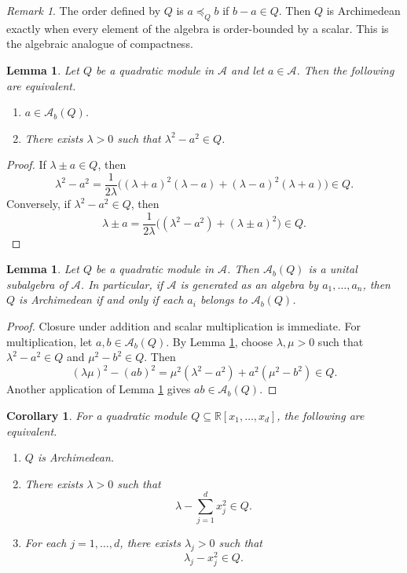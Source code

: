 \documentclass[11pt]{amsart}
\numberwithin{equation}{section}
\newtheorem{lemma}[theorem]{Lemma}
\newtheorem{corollary}[theorem]{Corollary}
\theoremstyle{definition}
\theoremstyle{remark}
\newtheorem{remark}[theorem]{Remark}
\newcommand{\R}{\mathbb{R}}
\newcommand{\Acal}{\mathcal{A}}
\newcommand{\Rxd}{\R[x_1,\dots,x_d]}
\newcommand{\1}{\mathbf{1}}
\begin{document}
\begin{remark}
The order defined by \(Q\) is \(a\preceq_Q b\) if \(b-a\in Q\). Then \(Q\) is Archimedean exactly when every element of the algebra is order-bounded by a scalar. This is the algebraic analogue of compactness.
\end{remark}

\begin{lemma}\label{lem:boundedcriterion}
Let \(Q\) be a quadratic module in \(\Acal\) and let \(a\in\Acal\). Then the following are equivalent.
\begin{enumerate}[label=\textup{(\roman*)}, leftmargin=2em]
\item \(a\in \Acal_b(Q)\).
\item There exists \(\lambda>0\) such that \(\lambda^2-a^2\in Q\).
\end{enumerate}
\end{lemma}

\begin{proof}
If \(\lambda\pm a\in Q\), then
\[
\lambda^2-a^2=\frac{1}{2\lambda}\bigl((\lambda+a)^2(\lambda-a)+(\lambda-a)^2(\lambda+a)\bigr)\in Q.
\]
Conversely, if \(\lambda^2-a^2\in Q\), then
\[
\lambda\pm a=\frac{1}{2\lambda}\bigl((\lambda^2-a^2)+(\lambda\pm a)^2\bigr)\in Q.
\]
\end{proof}

\begin{lemma}\label{lem:subalg}
Let \(Q\) be a quadratic module in \(\Acal\). Then \(\Acal_b(Q)\) is a unital subalgebra of \(\Acal\). In particular, if \(\Acal\) is generated as an algebra by \(a_1,\dots,a_n\), then \(Q\) is Archimedean if and only if each \(a_i\) belongs to \(\Acal_b(Q)\).
\end{lemma}

\begin{proof}
Closure under addition and scalar multiplication is immediate. For multiplication, let \(a,b\in\Acal_b(Q)\). By Lemma \ref{lem:boundedcriterion}, choose \(\lambda,\mu>0\) such that \(\lambda^2-a^2\in Q\) and \(\mu^2-b^2\in Q\). Then
\[
(\lambda\mu)^2-(ab)^2=\mu^2(\lambda^2-a^2)+a^2(\mu^2-b^2)\in Q.
\]
Another application of Lemma \ref{lem:boundedcriterion} gives \(ab\in\Acal_b(Q)\).
\end{proof}

\begin{corollary}\label{cor:archpoly}
For a quadratic module \(Q\subseteq\Rxd\), the following are equivalent.
\begin{enumerate}[label=\textup{(\roman*)}, leftmargin=2em]
\item \(Q\) is Archimedean.
\item There exists \(\lambda>0\) such that
\[
\lambda-\sum_{j=1}^d x_j^2\in Q.
\]
\item For each \(j=1,\dots,d\), there exists \(\lambda_j>0\) such that
\[
\lambda_j-x_j^2\in Q.
\]
\end{enumerate}
\end{corollary}
\end{document}

